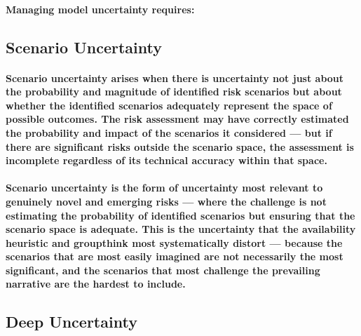 \paragraph{Managing model uncertainty requires:}
\begin{itemize}
\end{itemize}

\subsection{Scenario Uncertainty}
\paragraph{\textbf{Scenario uncertainty} arises when there is uncertainty not just about the probability and magnitude of identified risk scenarios but about whether the identified scenarios adequately represent the space of possible outcomes. The risk assessment may have correctly estimated the probability and impact of the scenarios it considered — but if there are significant risks outside the scenario space, the assessment is incomplete regardless of its technical accuracy within that space.}
\paragraph{Scenario uncertainty is the form of uncertainty most relevant to genuinely novel and emerging risks — where the challenge is not estimating the probability of identified scenarios but ensuring that the scenario space is adequate. This is the uncertainty that the availability heuristic and groupthink most systematically distort — because the scenarios that are most easily imagined are not necessarily the most significant, and the scenarios that most challenge the prevailing narrative are the hardest to include.}

\subsection{Deep Uncertainty}
